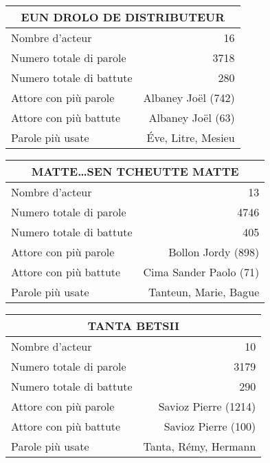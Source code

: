    \begin{table}[]
    \centering
    \begin{tabular}{lr}\toprule\multicolumn{2}{c}{EUN DROLO DE DISTRIBUTEUR} \\\midrule
\multicolumn{1}{l}{Nombre d'acteur}&16\\
\multicolumn{1}{l}{Numero totale di parole}&3718\\
\multicolumn{1}{l}{Numero totale di battute}&280\\
\multicolumn{1}{l}{Attore con più parole}&Albaney Joël (742)\\
\multicolumn{1}{l}{Attore con più battute}&Albaney Joël (63)\\
\multicolumn{1}{l}{Parole più usate}&Éve, Litre, Mesieu\\
    \bottomrule
    \end{tabular}%
    \end{table}
    \begin{table}[]
    \centering
    \begin{tabular}{lr}\toprule\multicolumn{2}{c}{MATTE\ldots SEN TCHEUTTE MATTE} \\\midrule
\multicolumn{1}{l}{Nombre d'acteur}&13\\
\multicolumn{1}{l}{Numero totale di parole}&4746\\
\multicolumn{1}{l}{Numero totale di battute}&405\\
\multicolumn{1}{l}{Attore con più parole}&Bollon Jordy (898)\\
\multicolumn{1}{l}{Attore con più battute}&Cima Sander Paolo (71)\\
\multicolumn{1}{l}{Parole più usate}&Tanteun, Marie, Bague\\
    \bottomrule
    \end{tabular}%
    \end{table}
    \begin{table}[]
    \centering
    \begin{tabular}{lr}\toprule\multicolumn{2}{c}{TANTA BETSII} \\\midrule
\multicolumn{1}{l}{Nombre d'acteur}&10\\
\multicolumn{1}{l}{Numero totale di parole}&3179\\
\multicolumn{1}{l}{Numero totale di battute}&290\\
\multicolumn{1}{l}{Attore con più parole}&Savioz Pierre (1214)\\
\multicolumn{1}{l}{Attore con più battute}&Savioz Pierre (100)\\
\multicolumn{1}{l}{Parole più usate}&Tanta, Rémy, Hermann\\
    \bottomrule
    \end{tabular}%
    \end{table}
